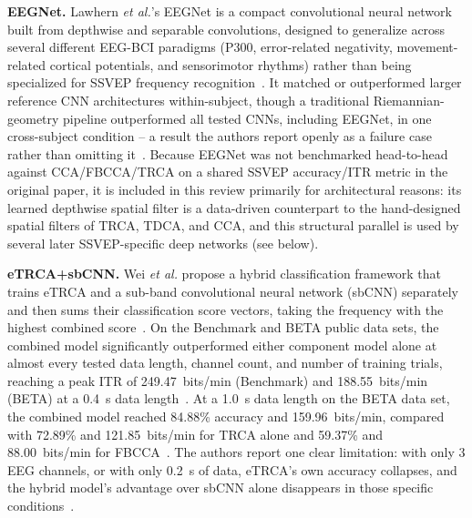 \documentclass[11pt]{article}
\begin{document}
\textbf{EEGNet.} Lawhern \textit{et al.}'s EEGNet is a compact convolutional neural network built from depthwise and separable convolutions, designed to generalize across several different EEG-BCI paradigms (P300, error-related negativity, movement-related cortical potentials, and sensorimotor rhythms) rather than being specialized for SSVEP frequency recognition~\cite{lawhern2018eegnet}. It matched or outperformed larger reference CNN architectures within-subject, though a traditional Riemannian-geometry pipeline outperformed all tested CNNs, including EEGNet, in one cross-subject condition -- a result the authors report openly as a failure case rather than omitting it~\cite{lawhern2018eegnet}. Because EEGNet was not benchmarked head-to-head against CCA/FBCCA/TRCA on a shared SSVEP accuracy/ITR metric in the original paper, it is included in this review primarily for architectural reasons: its learned depthwise spatial filter is a data-driven counterpart to the hand-designed spatial filters of TRCA, TDCA, and CCA, and this structural parallel is used by several later SSVEP-specific deep networks (see below).

\textbf{eTRCA+sbCNN.} Wei \textit{et al.} propose a hybrid classification framework that trains eTRCA and a sub-band convolutional neural network (sbCNN) separately and then sums their classification score vectors, taking the frequency with the highest combined score~\cite{wei2025etrcasbcnn}. On the Benchmark and BETA public data sets, the combined model significantly outperformed either component model alone at almost every tested data length, channel count, and number of training trials, reaching a peak ITR of 249.47~bits/min (Benchmark) and 188.55~bits/min (BETA) at a 0.4~s data length~\cite{wei2025etrcasbcnn}. At a 1.0~s data length on the BETA data set, the combined model reached 84.88\% accuracy and 159.96~bits/min, compared with 72.89\% and 121.85~bits/min for TRCA alone and 59.37\% and 88.00~bits/min for FBCCA~\cite{wei2025etrcasbcnn}. The authors report one clear limitation: with only 3 EEG channels, or with only 0.2~s of data, eTRCA's own accuracy collapses, and the hybrid model's advantage over sbCNN alone disappears in those specific conditions~\cite{wei2025etrcasbcnn}.
\end{document}
